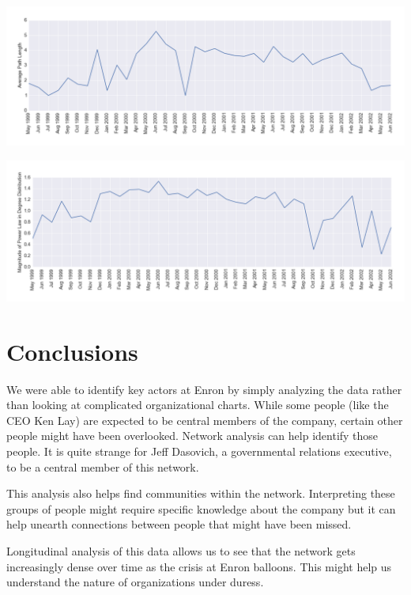 \documentclass[12pt]{article}
\begin{document}
\includegraphics[width=1\textwidth]{Timeseries_PathLength}

\includegraphics[width=1\textwidth]{Timeseries_PowerLaw}

\section{Conclusions}
	We were able to identify key actors at Enron by simply analyzing the data rather than looking at complicated organizational charts. While some people (like the CEO Ken Lay) are expected to be central members of the company, certain other people might have been overlooked. Network analysis can help identify those people. It is quite strange for Jeff Dasovich, a governmental relations executive, to be a central member of this network.
	
	This analysis also helps find communities within the network. Interpreting these groups of people might require specific knowledge about the company but it can help unearth connections between people that might have been missed.
	
	Longitudinal analysis of this data allows us to see that the network gets increasingly dense over time as the crisis at Enron balloons. This might help us understand the nature of organizations under duress. 
\end{document}

